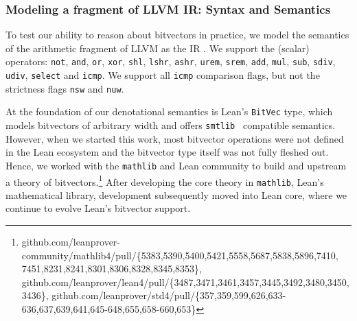 \subsubsection{Modeling a fragment of LLVM IR: Syntax and Semantics}

To test our ability to reason about bitvectors in practice, we model the semantics of the arithmetic fragment of LLVM as the IR .
We support the (scalar) operators:
\texttt{not}, \texttt{and}, \texttt{or}, \texttt{xor}, \texttt{shl}, \texttt{lshr}, \texttt{ashr}, \texttt{urem}, \texttt{srem}, \texttt{add}, \texttt{mul}, \texttt{sub}, \texttt{sdiv}, \texttt{udiv}, \texttt{select} and \texttt{icmp}.
We support all \texttt{icmp} comparison flags, but not the strictness flags \texttt{nsw} and \texttt{nuw}.

At the foundation of our denotational semantics is Lean's \texttt{BitVec} type, which models bitvectors of arbitrary width and offers \texttt{smtlib}~\cite{barrett2010smt} compatible semantics.
However, when we started this work, most bitvector operations were not defined in the Lean ecosystem and the bitvector type itself was not fully fleshed out.
Hence, we worked with the \texttt{mathlib} and Lean community to build and upstream a theory of bitvectors.\footnote{github.com/leanprover-community/mathlib4/pull/\{5383,5390,5400,5421,5558,5687,5838,5896,7410,\\7451,8231,8241,8301,8306,8328,8345,8353\},\\
github.com/leanprover/lean4/pull/\{3487,3471,3461,3457,3445,3492,3480,3450,3436\}, github.com/leanprover/std4/pull/\{357,359,599,626,633-636,637,639,641,645-648,655,658-660,653\}}
After developing the core theory in \texttt{mathlib}, Lean's mathematical library, development subsequently moved into Lean core, where we continue to evolve Lean's bitvector support.

